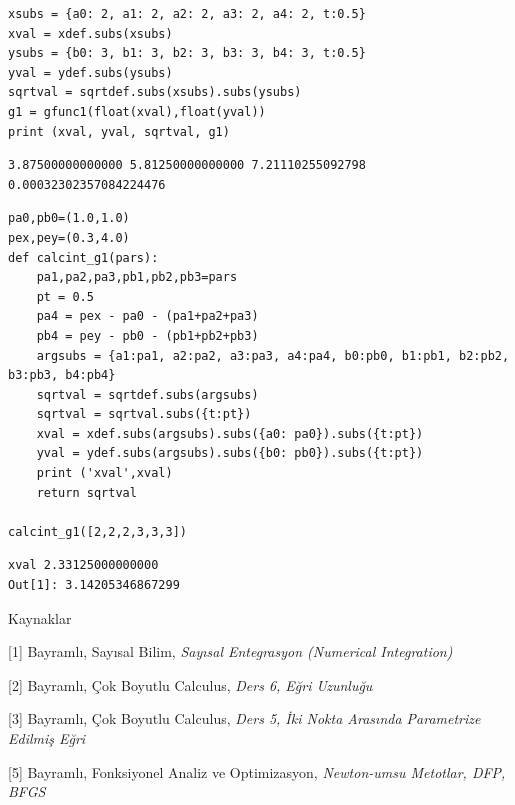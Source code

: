 \documentclass[12pt,fleqn]{article}\usepackage{../../common}
\begin{document}
\begin{verbatim}
xsubs = {a0: 2, a1: 2, a2: 2, a3: 2, a4: 2, t:0.5}
xval = xdef.subs(xsubs)
ysubs = {b0: 3, b1: 3, b2: 3, b3: 3, b4: 3, t:0.5}
yval = ydef.subs(ysubs)
sqrtval = sqrtdef.subs(xsubs).subs(ysubs)
g1 = gfunc1(float(xval),float(yval))
print (xval, yval, sqrtval, g1)
\end{verbatim}

\begin{verbatim}
3.87500000000000 5.81250000000000 7.21110255092798 0.00032302357084224476
\end{verbatim}

\begin{verbatim}
pa0,pb0=(1.0,1.0)
pex,pey=(0.3,4.0)
def calcint_g1(pars):
    pa1,pa2,pa3,pb1,pb2,pb3=pars
    pt = 0.5
    pa4 = pex - pa0 - (pa1+pa2+pa3)
    pb4 = pey - pb0 - (pb1+pb2+pb3)
    argsubs = {a1:pa1, a2:pa2, a3:pa3, a4:pa4, b0:pb0, b1:pb1, b2:pb2, b3:pb3, b4:pb4}
    sqrtval = sqrtdef.subs(argsubs)
    sqrtval = sqrtval.subs({t:pt})
    xval = xdef.subs(argsubs).subs({a0: pa0}).subs({t:pt})
    yval = ydef.subs(argsubs).subs({b0: pb0}).subs({t:pt})
    print ('xval',xval)
    return sqrtval
    
calcint_g1([2,2,2,3,3,3])
\end{verbatim}

\begin{verbatim}
xval 2.33125000000000
Out[1]: 3.14205346867299
\end{verbatim}

Kaynaklar 

[1] Bayramlı, Sayısal Bilim, {\em Sayısal Entegrasyon (Numerical Integration)}

[2] Bayramlı, Çok Boyutlu Calculus, {\em Ders 6, Eğri Uzunluğu}

[3] Bayramlı, Çok Boyutlu Calculus, {\em Ders 5, İki Nokta Arasında Parametrize Edilmiş Eğri}

[5] Bayramlı, Fonksiyonel Analiz ve Optimizasyon, {\em Newton-umsu Metotlar, DFP, BFGS }
\end{document}
